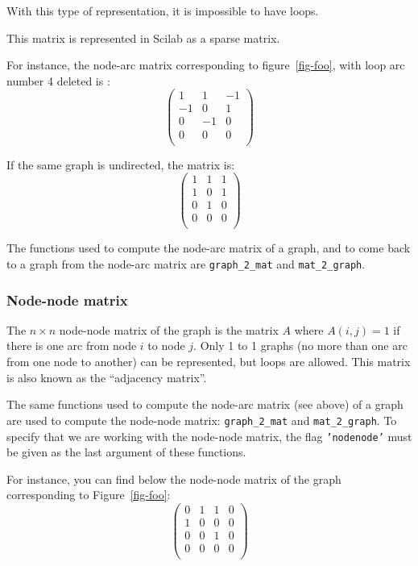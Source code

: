 \documentclass[11pt]{article}
\newcommand{\func}[1]{\texttt{#1}}
\begin{document}
With this type of representation, it is impossible to have loops.

This matrix is represented in Scilab as a sparse matrix.

For instance, the node-arc matrix corresponding to figure~\ref{fig-foo},
with loop arc number 4 deleted is :
\[\left(\begin{array}{rrr}
 1 &  1 & -1 \\
-1 &  0 &  1 \\
 0 & -1 &  0 \\
 0 &  0 &  0 \\
\end{array}\right)\]

If the same graph is undirected, the matrix is:
\[\left(\begin{array}{ccc}
 1 &  1 &  1 \\
 1 &  0 &  1 \\
 0 &  1 &  0 \\
 0 &  0 &  0 \\
\end{array}\right)\]

The functions used to compute the node-arc matrix
of a graph, and to come back to a graph from the node-arc matrix are
\func{graph\_2\_mat} and \func{mat\_2\_graph}.

\subsubsection{Node-node matrix}

The $n\times n$ node-node
matrix of the
graph is the matrix $A$ where $A(i,j)=1$ if there is one arc from node $i$ to 
node
$j$. Only 1 to 1
graphs (no more than one arc from one node to another) can be
represented, but loops are allowed.
This matrix is also known as the ``adjacency matrix''.

The same functions used to compute the node-arc matrix
(see above) of a graph are used to compute the node-node
matrix: \texttt{graph\_2\_mat}
and \texttt{mat\_2\_graph}. To
specify that we are working with the node-node matrix, the flag
\texttt{'node\-node'} must be given as the last argument of these
functions.

For instance, you can find below the node-node  matrix of the graph
corresponding to Figure~\ref{fig-foo}:
\[\left(\begin{array}{cccc}
 0 & 1 & 1 & 0 \\
 1 & 0 & 0 & 0 \\
 0 & 0 & 1 & 0 \\
 0 & 0 & 0 & 0 \\
\end{array}\right)\]
\end{document}
